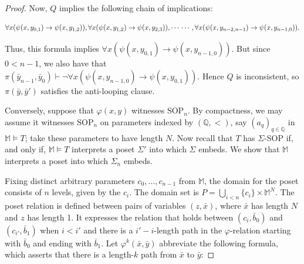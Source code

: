 \documentclass[10pt,a4paper]{amsart}
\newcommand{\bbM}{\mathbb{M}}
\newcommand{\bbQ}{\mathbb{Q}}
\newcommand{\tp}{\text{tp}}
\newcommand{\SOP}{\text{SOP}}
\newcommand{\vphi}{\varphi}
\begin{document}
\begin{proof}
    Now, $Q$ implies the following chain of implications:

   $$
    \forall x(\psi(x, y_{0,1})\to \psi(x, y_{1,2})), \forall x(\psi(x, y_{1,2})\to \psi(x, y_{2,3})), \dotsm\\
    \dotsm, \forall x(\psi(x, y_{n-2,n-1})\to \psi(x, y_{n-1,0})).
  $$


    Thus, this formula implies $\forall x(\psi(x, y_{0,1})\to \psi(x, y_{n-1,0}))$. But since $0 < n-1$, we also have that $\pi(\bar{y}_{n-1},\bar{y}_0) \vdash\neg \forall x(\psi(x, y_{n-1,0})\to \psi(x, y_{0, 1}))$. Hence $Q$ is inconsistent, so $\pi(\bar{y}, \bar{y}')$ satisfies the anti-looping clause.
    




    Conversely, suppose that $\vphi(x,y)$ witnesses $\SOP_n$. By compactness, we may assume it witnesses $\SOP_n$ on parameters indexed by $(\bbQ,<)$, say $(a_q)_{q\in\bbQ}$ in $\bbM\models T$; take these parameters to have length $N$. %
Now recall that $T$ has $\Sigma$-SOP if, and only if, $\bbM\models T$ interprets a poset $\Sigma'$ into which $\Sigma$ embeds. We show that $\bbM$ interprets a poset into which $\Sigma_n$ embeds. 

Fixing distinct arbitrary parameters $c_0,\dots, c_{n-1}$ from $\bbM$, the domain for the poset consists of $n$ levels, given by the $c_i$. The domain set is $P=\bigcup_{i<n}\{c_i\}\times\bbM^N$. The poset relation is defined between pairs of variables $(z,\bar{x})$, where $\bar{x}$ has length $N$ and $z$ has length 1. It expresses the relation that holds between $(c_i, \bar{b}_0)$ and $(c_{i'},\bar{b}_1)$ when $i<i'$ and there is a $i'-i$-length path in the $\vphi$-relation starting with $\bar{b}_0$ and ending with $\bar{b}_1$. Let $\vphi^k(\bar{x}, \bar{y})$ abbreviate the following formula, which asserts that there is a length-$k$ path from $\bar{x}$ to $\bar{y}$:


\end{proof}
\end{document}
